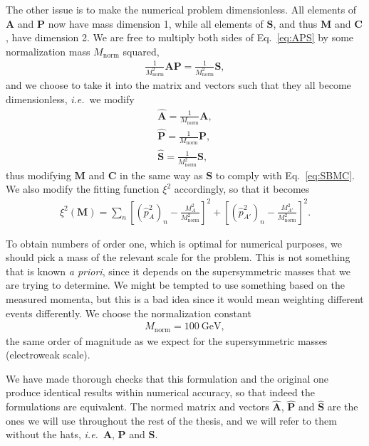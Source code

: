 \documentclass[twoside,english]{uiofysmaster}
\begin{document}
The other issue is to make the numerical problem dimensionless. All elements of $\mathbf{A}$ and $\mathbf{P}$ now have mass dimension 1, while all elements of $\mathbf{S}$, and thus $\mathbf{M}$ and $\mathbf{C}$, have dimension 2. We are free to multiply both sides of Eq.\ \eqref{eq:APS} by some normalization mass $M_\mathrm{norm}$ squared,
\begin{align}
	\frac{1}{M_\mathrm{norm}^2} \mathbf{A}\mathbf{P} = \frac{1}{M_\mathrm{norm}^2} \mathbf{S},
\end{align}
and we choose to take it into the matrix and vectors such that they all become dimensionless, {\it i.e.}\ we modify
\begin{align}
	\mathbf{\hat A} = \frac{1}{M_\mathrm{norm}}\mathbf{A},\nonumber \\
	\mathbf{\hat P} = \frac{1}{M_\mathrm{norm}}\mathbf{P},\label{eq:vectors_normalized}\\
	\mathbf{\hat S} = \frac{1}{M_\mathrm{norm}^2}\mathbf{S},\nonumber 
\end{align}
thus modifying $\mathbf{M}$ and $\mathbf{C}$ in the same way as $\mathbf{S}$ to comply with Eq.\ \eqref{eq:SBMC}. We also modify the fitting function $\xi^2$ accordingly, so that it becomes
\begin{align}
	\xi^2(\mathbf{M}) = \sum_n \left[(\hat p_{A}^2)_n - \frac{M_A^2}{M_\mathrm{norm}^2}\right]^2 + \left[(\hat p_{A'}^2)_n - \frac{M_{A'}^2}{M_\mathrm{norm}^2}\right]^2.\label{eq:xisquared_modified}
\end{align}

To obtain numbers of order one, which is optimal for numerical purposes, we should pick a mass of the relevant scale for the problem. This is not something that is known {\it a priori}, since it depends on the supersymmetric masses that we are trying to determine. We might be tempted to use something based on the measured momenta, but this is a bad idea since it would mean weighting different events differently. We choose the normalization constant
\begin{align}
	M_\mathrm{norm} = 100 ~\mathrm{GeV},
\end{align}
the same order of magnitude as we expect for the supersymmetric masses (electroweak scale). 

We have made thorough checks that this formulation and the original one produce identical results within numerical accuracy, so that indeed the formulations are equivalent. The normed matrix and vectors $\mathbf{\hat A}$, $\mathbf{\hat P}$ and $\mathbf{\hat S}$ are the ones we will use throughout the rest of the thesis, and we will refer to them without the hats, {\it i.e.}\ $\mathbf A$, $\mathbf P$ and $\mathbf S$.
\end{document}
